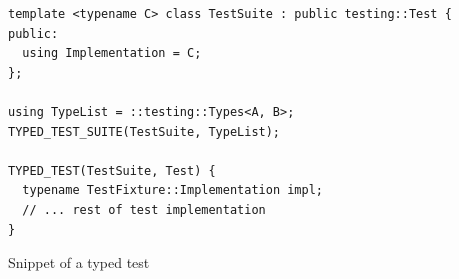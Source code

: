 \begin{listing}
  \begin{verbatim}
template <typename C> class TestSuite : public testing::Test {
public:
  using Implementation = C;
};

using TypeList = ::testing::Types<A, B>;
TYPED_TEST_SUITE(TestSuite, TypeList);

TYPED_TEST(TestSuite, Test) {
  typename TestFixture::Implementation impl;
  // ... rest of test implementation
}
    \end{verbatim}
  \caption{Snippet of a  typed test}\label{lst:gtest-typed}
\end{listing}